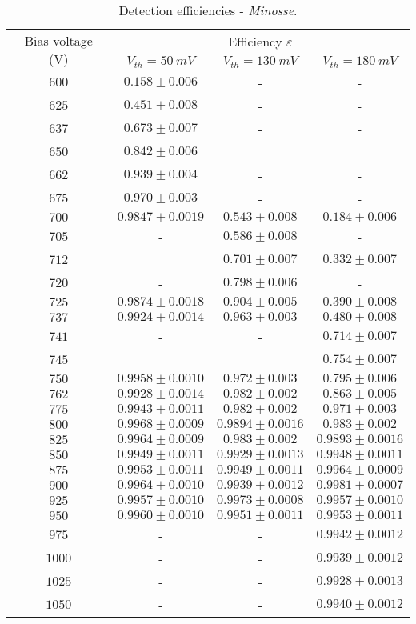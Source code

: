 \begin{table}[!htp]
	\centering
	\begin{tabular}{c|ccc}
		\toprule
		\multirow{2}{*}{Bias voltage (V)}&\multicolumn{3}{c}{Efficiency $\varepsilon$} \\ \cline{2-4}
		&$V_{th}=\SI{50}{mV}$&$V_{th}=\SI{130}{mV}$&$V_{th}=\SI{180}{mV}$\\ \midrule
		$600$ & $0.158 \pm 0.006$ & - & - \\
		$625$ & $0.451 \pm 0.008$ & - & - \\
		$637$ & $0.673 \pm 0.007$ & - & - \\
		$650$ & $0.842 \pm 0.006$ & - & - \\
		$662$ & $0.939 \pm 0.004$ & - & - \\
		$675$ & $0.970 \pm 0.003$ & - & - \\
		$700$ & $0.9847 \pm 0.0019$ & $0.543 \pm 0.008$ & $0.184 \pm 0.006$ \\
		$705$ & - & $0.586 \pm 0.008$ & - \\
		$712$ & - & $0.701 \pm 0.007$ & $0.332 \pm 0.007$ \\
		$720$ & - & $0.798 \pm 0.006$ & - \\
		$725$ & $0.9874 \pm 0.0018$ & $0.904 \pm 0.005$ & $0.390 \pm 0.008$ \\
		$737$ & $0.9924 \pm 0.0014$ & $0.963 \pm 0.003$ & $0.480 \pm 0.008$ \\
		$741$ & - & - & $0.714 \pm 0.007$ \\
		$745$ & - & - & $0.754 \pm 0.007$ \\
		$750$ & $0.9958 \pm 0.0010$ & $0.972 \pm 0.003$ & $0.795 \pm 0.006$ \\
		$762$ & $0.9928 \pm 0.0014$ & $0.982 \pm 0.002$ & $0.863 \pm 0.005$ \\
		$775$ & $0.9943 \pm 0.0011$ & $0.982 \pm 0.002$ & $0.971 \pm 0.003$ \\
		$800$ & $0.9968 \pm 0.0009$ & $0.9894 \pm 0.0016$ & $0.983 \pm 0.002$ \\
		$825$ & $0.9964 \pm 0.0009$ & $0.983 \pm 0.002$ & $0.9893 \pm 0.0016$ \\
		$850$ & $0.9949 \pm 0.0011$ & $0.9929 \pm 0.0013$ & $0.9948 \pm 0.0011$ \\
		$875$ & $0.9953 \pm 0.0011$ & $0.9949 \pm 0.0011$ & $0.9964 \pm 0.0009$ \\
		$900$ & $0.9964 \pm 0.0010$ & $0.9939 \pm 0.0012$ & $0.9981 \pm 0.0007$ \\
		$925$ & $0.9957 \pm 0.0010$ & $0.9973 \pm 0.0008$ & $0.9957 \pm 0.0010$ \\
		$950$ & $0.9960 \pm 0.0010$ & $0.9951 \pm 0.0011$ & $0.9953 \pm 0.0011$ \\
		$975$ & - & - & $0.9942 \pm 0.0012$ \\
		$1000$ & - & - & $0.9939 \pm 0.0012$ \\
		$1025$ & - & - & $0.9928 \pm 0.0013$ \\
		$1050$ & - & - & $0.9940 \pm 0.0012$ \\	
		\bottomrule
	\end{tabular}
	\caption{Detection efficiencies - \emph{Minosse}.}
\end{table}

